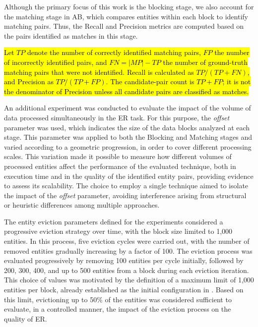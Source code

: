 \documentclass{ieeeaccess}
\begin{document}
Although the primary focus of this work is the blocking stage, we also account for the matching stage in AB, which compares entities within each block to identify matching pairs. Thus, the Recall and Precision metrics are computed based on the pairs identified as matches in this stage.

\hl{Let $TP$ denote the number of correctly identified matching pairs, $FP$ the number of incorrectly identified pairs, and $FN=|MP|-TP$ the number of ground-truth matching pairs that were not identified. Recall is calculated as $TP/(TP+FN)$, and Precision as $TP/(TP+FP)$. The candidate-pair count is $TP+FP$; it is not the denominator of Precision unless all candidate pairs are classified as matches.}

An additional experiment was conducted to evaluate the impact of the volume of data processed simultaneously in the ER task. For this purpose, the \textit{offset} parameter was used, which indicates the size of the data blocks analyzed at each stage. This parameter was applied to both the Blocking and Matching stages and varied according to a geometric progression, in order to cover different processing scales. This variation made it possible to measure how different volumes of processed entities affect the performance of the evaluated technique, both in execution time and in the quality of the identified entity pairs, providing evidence to assess its scalability. The choice to employ a single technique aimed to isolate the impact of the \textit{offset} parameter, avoiding interference arising from structural or heuristic differences among multiple approaches.

The entity eviction parameters defined for the experiments considered a progressive eviction strategy over time, with the block size limited to 1,000 entities. In this process, five eviction cycles were carried out, with the number of removed entities gradually increasing by a factor of 100. The eviction process was evaluated progressively by removing 100 entities per cycle initially, followed by 200, 300, 400, and up to 500 entities from a block during each eviction iteration. This choice of values was motivated by the definition of a maximum limit of 1,000 entities per block, already established as the initial configuration in \cite{10.1109/TKDE.2024.3361022}. Based on this limit, evictioning up to 50\% of the entities was considered sufficient to evaluate, in a controlled manner, the impact of the eviction process on the quality of ER.
\end{document}
